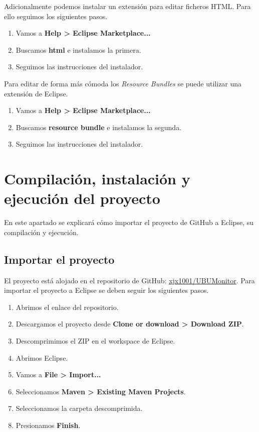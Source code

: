 Adicionalmente podemos instalar un extensión para editar ficheros HTML.
Para ello seguimos los siguientes pasos.
\begin{enumerate}
	\item Vamos a \textbf{Help > Eclipse Marketplace...}
	\item Buscamos \textbf{html} e instalamos la primera.
	\item Seguimos las instrucciones del instalador.
\end{enumerate}

Para editar de forma más cómoda los \emph{Resource Bundles} se puede utilizar una extensión de Eclipse.
\begin{enumerate}
	\item Vamos a \textbf{Help > Eclipse Marketplace...}
	\item Buscamos \textbf{resource bundle} e instalamos la segunda.
	\item Seguimos las instrucciones del instalador.
\end{enumerate}

\section{Compilación, instalación y ejecución del proyecto}
En este apartado se explicará cómo importar el proyecto de GitHub a Eclipse, su compilación y ejecución.

\subsection{Importar el proyecto}
El proyecto está alojado en el repositorio de GitHub: \href{https://github.com/xjx1001/UBUMonitor}{xjx1001/UBUMonitor}.
Para importar el proyecto a Eclipse se deben seguir los siguientes pasos.
\begin{enumerate}
	\item Abrimos el enlace del repositorio.
	\item Descargamos el proyecto desde \textbf{Clone or download > Download ZIP}.
	\item Descomprimimos el ZIP en el workspace de Eclipse.
	\item Abrimos Eclipse.
	\item Vamos a \textbf{File > Import...}
	\item Seleccionamos \textbf{Maven > Existing Maven Projects}.
	\item Seleccionamos la carpeta descomprimida.
	\item Presionamos \textbf{Finish}.
\end{enumerate}

